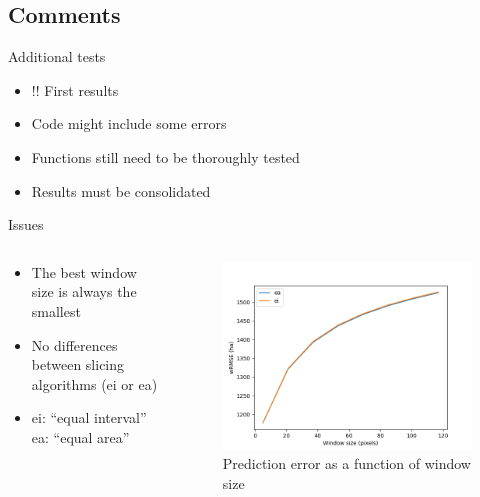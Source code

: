 \documentclass[10pt,table,dvipsnames,compress]{beamer}
\begin{document}
\subsection{Comments}
\label{sec:org27f0b31}

\begin{frame}[label={sec:org770e38d}]{Additional tests}
\begin{itemize}
\item \alert{!!} First results
\item Code might include some errors
\item Functions still need to be thoroughly tested
\item Results must be consolidated
\end{itemize}
\end{frame}

\begin{frame}[label={sec:org86e3aea}]{Issues}
\begin{columns}
\begin{column}{0.5\columnwidth}
\begin{itemize}
\item The best window size is always the smallest
\item No differences between slicing algorithms (ei or ea)
\item ei: ``equal interval''\\
ea: ``equal area''
\end{itemize}
\end{column}

\begin{column}{0.5\columnwidth}
\begin{figure}[htbp]
\centering
\includegraphics[width=\textwidth]{figs/map_comp.png}
\caption{\label{fig:org8ae83e2}Prediction error as a function of window size}
\end{figure}
\end{column}
\end{columns}
\end{frame}
\end{document}
